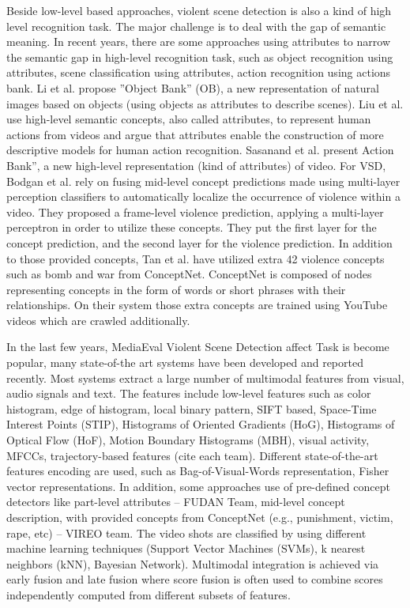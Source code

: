 \documentclass[twocolumn]{bmcart}%
\begin{document}
Beside low-level based approaches, violent scene detection is also a kind of high level recognition task. The major challenge is to deal with the gap of semantic meaning. In recent years, there are some approaches using attributes to narrow the semantic gap in high-level recognition task, such as object recognition using attributes, scene classification using attributes, action recognition using actions bank\cite{23}. Li et al.\cite{15} propose ”Object Bank” (OB), a new representation of natural images based on objects (using objects as attributes to describe scenes). Liu et al.\cite{18} use high-level semantic concepts, also called attributes, to represent human actions from videos and argue that attributes enable the construction of more descriptive models for human action recognition. Sasanand et al.\cite{23} present Action Bank”, a new high-level representation (kind of attributes) of video.  For VSD, Bodgan et al.\cite{13} rely on fusing mid-level concept predictions made using multi-layer perception classifiers to automatically localize the occurrence of violence within a video.  They proposed a frame-level violence prediction, applying a multi-layer perceptron in order to utilize these concepts. They put the first layer for the concept prediction, and the second layer for the violence prediction. In addition to those provided concepts, Tan et al.\cite{tan2013vireo} have utilized extra 42 violence concepts such as bomb and war from ConceptNet\cite{liu2004conceptnet}. ConceptNet is composed of nodes representing concepts in the form of words or short phrases with their relationships. On their system those extra concepts are trained using YouTube videos which are crawled additionally. 

In the last few years, MediaEval Violent Scene Detection affect Task is become popular, many state-of-the art systems have been developed and reported recently\cite{demarty2014benchmarking}. Most systems extract a large number of multimodal features from visual, audio signals and text.  The features include low-level features such as color histogram, edge of histogram, local binary pattern, SIFT based, Space-Time Interest Points (STIP), Histograms of Oriented Gradients (HoG), Histograms of Optical Flow (HoF), Motion Boundary Histograms (MBH), visual activity, MFCCs, trajectory-based features  (cite each team). Different state-of-the-art features encoding are used, such as Bag-of-Visual-Words representation, Fisher vector representations. In addition, some approaches use of pre-defined concept detectors like part-level attributes – FUDAN Team\cite{dai2013fudan}, mid-level concept description, with provided concepts from ConceptNet (e.g., punishment, victim, rape, etc) – VIREO team\cite{tan2013vireo}. The video shots are classified by using different machine learning techniques (Support Vector Machines (SVMs), k nearest neighbors (kNN), Bayesian Network). Multimodal integration is achieved via early fusion\cite{penet2013technicolor} and late fusion\cite{penet2013technicolor,sjoberg2013far,derbas2013lig,dai2013fudan} where score fusion is often used to combine scores independently computed from different subsets of features.
\end{document}
